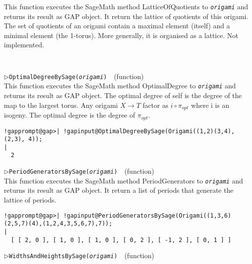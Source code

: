 \documentclass[a4paper,11pt]{report}
\begin{document}
{{{ This function executes the SageMath method LatticeOfQuotients to \mbox{\texttt{\mdseries\slshape origami}} and returns its result as \textsf{GAP} object. It return the lattice of quotients of this origami. The set of
quotients of an origami contain a maximal element (itself) and a minimal
element (the 1-torus). More generally, it is organised as a lattice. Not
implemented. 
\begin{Verbatim}[commandchars=!@|,fontsize=\small,frame=single,label=Example]
  
\end{Verbatim}
 \noindent\textcolor{FuncColor}{$\triangleright$\enspace\texttt{OptimalDegreeBySage({\mdseries\slshape origami})
\label{OptimalDegreeBySage}
}\hfill{\scriptsize (function)}}\\


 This function executes the SageMath method OptimalDegree to \mbox{\texttt{\mdseries\slshape origami}} and returns its result as \textsf{GAP} object. The optimal degree of self is the degree of the map to the largest
torus. Any origami $X \rightarrow T$ factor as $i \circ \pi_{opt}$ where i is an isogeny. The optimal degree is the degree of $\pi_{opt}$. 
\begin{Verbatim}[commandchars=!@|,fontsize=\small,frame=single,label=Example]
  !gapprompt@gap>| !gapinput@OptimalDegreeBySage(Origami((1,2)(3,4), (2,3), 4));
|
  2
\end{Verbatim}
 \noindent\textcolor{FuncColor}{$\triangleright$\enspace\texttt{PeriodGeneratorsBySage({\mdseries\slshape origami})
\label{PeriodGeneratorsBySage}
}\hfill{\scriptsize (function)}}\\


 This function executes the SageMath method PeriodGenerators to \mbox{\texttt{\mdseries\slshape origami}} and returns its result as \textsf{GAP} object. It return a list of periods that generate the lattice of periods. 
\begin{Verbatim}[commandchars=!@|,fontsize=\small,frame=single,label=Example]
  !gapprompt@gap>| !gapinput@PeriodGeneratorsBySage(Origami((1,3,6)(2,5,7)(4),(1,2,4,3,5,6,7),7));    
|
  [ [ 2, 0 ], [ 1, 0 ], [ 1, 0 ], [ 0, 2 ], [ -1, 2 ], [ 0, 1 ] ]
\end{Verbatim}
 \noindent\textcolor{FuncColor}{$\triangleright$\enspace\texttt{WidthsAndHeightsBySage({\mdseries\slshape origami})
\label{WidthsAndHeightsBySage}
}\hfill{\scriptsize (function)}}\\


}}}
\end{document}
